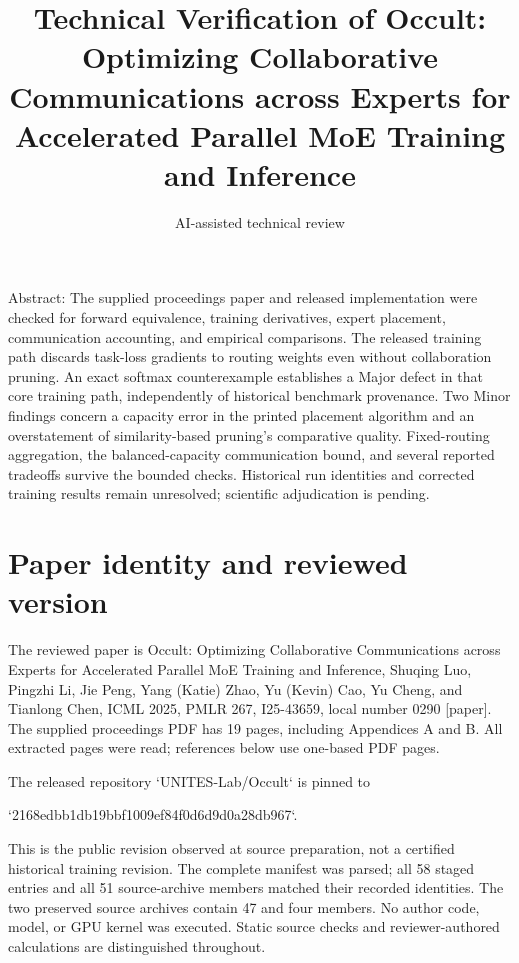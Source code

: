 \documentclass[10pt]{article}
\title{Technical Verification of Occult:
Optimizing Collaborative Communications across Experts
for Accelerated Parallel MoE Training and Inference}
\author{AI-assisted technical review}
\date{}
\begin{document}
\maketitle
Abstract: The supplied proceedings paper and released implementation were checked for forward equivalence, training derivatives, expert placement, communication accounting, and empirical comparisons. The released training path discards task-loss gradients to routing weights even without collaboration pruning. An exact softmax counterexample establishes a Major defect in that core training path, independently of historical benchmark provenance. Two Minor findings concern a capacity error in the printed placement algorithm and an overstatement of similarity-based pruning’s comparative quality. Fixed-routing aggregation, the balanced-capacity communication bound, and several reported tradeoffs survive the bounded checks. Historical run identities and corrected training results remain unresolved; scientific adjudication is pending.\par
\section*{Paper identity and reviewed version}
The reviewed paper is Occult: Optimizing Collaborative Communications across Experts for Accelerated Parallel MoE Training and Inference, Shuqing Luo, Pingzhi Li, Jie Peng, Yang (Katie) Zhao, Yu (Kevin) Cao, Yu Cheng, and Tianlong Chen, ICML 2025, PMLR 267, I25-43659, local number 0290 [paper]. The supplied proceedings PDF has 19 pages, including Appendices A and B. All extracted pages were read; references below use one-based PDF pages.\par
The released repository `UNITES-Lab/Occult` is pinned to\par
`2168edbb1db19bbf1009ef84f0d6d9d0a28db967`.\par
This is the public revision observed at source preparation, not a certified historical training revision. The complete manifest was parsed; all 58 staged entries and all 51 source-archive members matched their recorded identities. The two preserved source archives contain 47 and four members. No author code, model, or GPU kernel was executed. Static source checks and reviewer-authored calculations are distinguished throughout.\par
\end{document}
